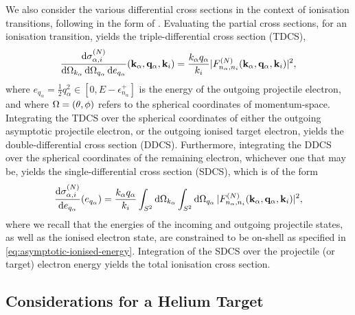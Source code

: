 \documentclass[]{article}
\begin{document}
We also consider the various differential cross sections in the context of
ionisation transitions, following in the form of \cite{PhysRevA.54.2991}.
Evaluating the partial cross sections, for an ionisation transition, yields the
triple-differential cross section (TDCS),
\begin{equation}
  \label{eq:triple-differential-cross-section}
  \dfrac
  {
    \dd{\sigma_{\alpha, i}^{(N)}}
  }
  {
    \dd{\Omega_{k_{\alpha}}}
    \dd{\Omega_{q_{\alpha}}}
    \dd{e_{q_{\alpha}}}
  }
  (
    \vb{k}_{\alpha}, \vb{q}_{\alpha}, \vb{k}_{i}
  )
  =
  \dfrac{k_{\alpha} q_{\alpha}}{k_{i}}
  \lvert
    F_{n_{\alpha}, n_{i}}^{(N)}(
      \vb{k}_{\alpha}, \vb{q}_{\alpha}, \vb{k}_{i}
    )
  \rvert^{2}
  ,
\end{equation}
where $e_{q_{\alpha}} = \tfrac{1}{2} q_{\alpha}^{2} \in [0, E - \epsilon_{n_{\alpha}}^{+}]$ is the energy of the outgoing
projectile electron, and where $\Omega = (\theta, \phi)$ refers to the
spherical coordinates of momentum-space.
Integrating the TDCS over the spherical coordinates of either the outgoing
asymptotic projectile electron, or the outgoing ionised target electron, yields
the double-differential cross section (DDCS).
Furthermore, integrating the DDCS over the spherical coordinates of the
remaining electron, whichever one that may be, yields the single-differential
cross section (SDCS), which is of the form
\begin{equation}
  \label{eq:single-differential-cross-section}
  \dv{\sigma_{\alpha, i}^{\lr{N}}}{e_{q_{\alpha}}}\lr{e_{q_{\alpha}}}
  =
  \dfrac{k_{\alpha} q_{\alpha}}{k_{i}}
  \int_{S^{2}}
  \dd{\Omega_{k_{\alpha}}}
  \int_{S^{2}}
  \dd{\Omega_{q_{\alpha}}}
  \lrabs
  {
    F_{n_{\alpha}, n_{i}}^{\lr{N}}\lr
    {
      \vb{k}_{\alpha}, \vb{q}_{\alpha}, \vb{k}_{i}
    }
  }^{2}
  ,
\end{equation}
where we recall that the energies of the incoming and outgoing projectile
states, as well as the ionised electron state, are constrained to be on-shell as
specified in \eqref{eq:asymptotic-ionised-energy}.
Integration of the SDCS over the projectile (or target) electron energy yields
the total ionisation cross section.

\subsection{Considerations for a Helium Target}
\label{sec:th-he-target}
\end{document}
